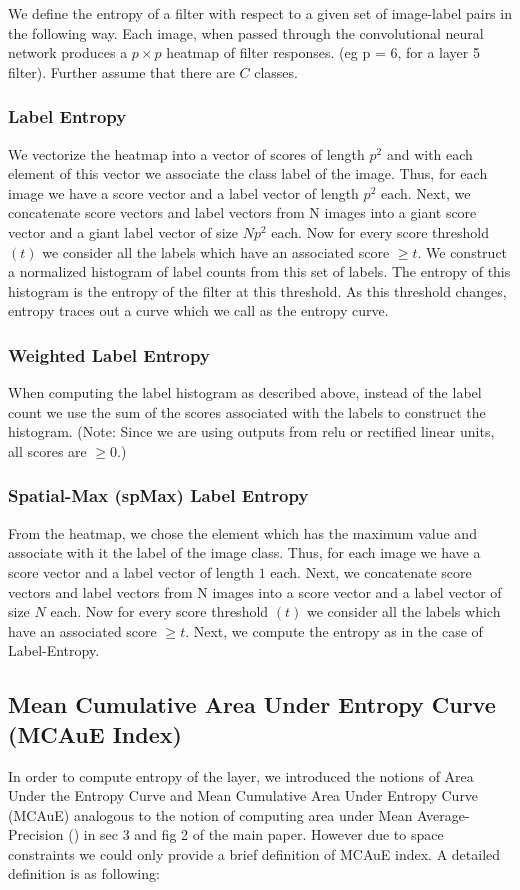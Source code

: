 \documentclass[runningheads]{llncs}
\begin{document}
We define the entropy of a filter with respect to a given set of image-label pairs in the following way. Each image, when passed through the convolutional neural network produces a $p \times p$ heatmap of filter responses. (eg p = 6, for a layer 5 filter). Further assume that there are $C$ classes.
\subsubsection{Label Entropy}
\label{sub:def-label-ent}
We vectorize the heatmap into a vector of scores of length $p^2$ and with each element of this vector we associate the class label of the image. Thus, for each image we have a score vector and a label vector of length $p^2$ each. Next, we concatenate score vectors and label vectors from N images into a giant score vector and a giant label vector  of size $Np^2$ each. Now for every score threshold $(t)$ we consider all the labels which have an associated score $\geq t$. We construct a normalized histogram of label counts from this set of labels. The entropy of this histogram is the entropy of the filter at this threshold. As this threshold changes, entropy traces out a curve which we call as the entropy curve.  

\subsubsection{Weighted Label Entropy}
\label{sub:def-weighted-label-ent}
When computing the label histogram as described above, instead of the label count we use the sum of the scores associated with the labels to construct the histogram. (Note: Since we are using outputs from relu or rectified linear units, all scores are $\geq 0$.)

\subsubsection{Spatial-Max (spMax) Label Entropy}
\label{sub:def-spmax-label-ent}
From the heatmap, we chose the element which has the maximum value and associate with it the label of the image class. Thus, for each image we have a score vector and a label vector of length $1$ each. Next, we concatenate score vectors and label vectors from N images into a  score vector and a  label vector  of size $N$ each. Now for every score threshold $(t)$ we consider all the labels which have an associated score $\geq t$. Next, we compute the entropy as in the case of Label-Entropy.

\subsection{Mean Cumulative Area Under Entropy Curve (MCAuE Index)}
In order to compute entropy of the layer, we introduced the notions of Area Under the Entropy Curve and Mean Cumulative Area Under Entropy Curve (MCAuE) analogous to the notion of computing area under Mean Average-Precision (\cite{Pascal}) in sec 3 and fig 2 of the main paper. However due to space constraints we could only provide a brief definition of MCAuE index. A detailed definition is as following:
\end{document}

